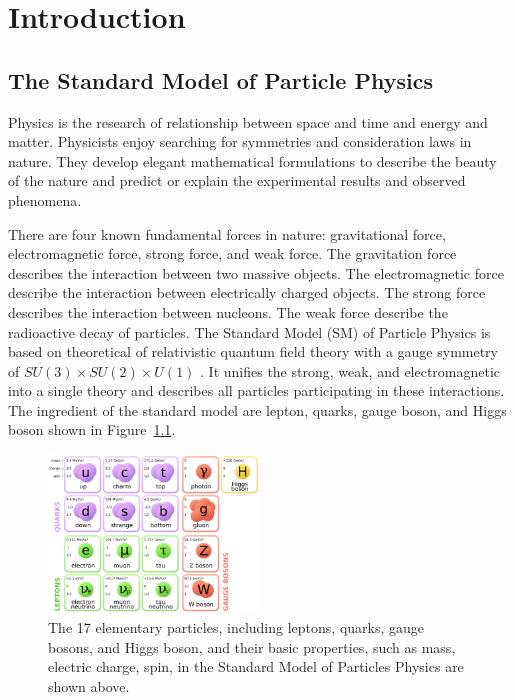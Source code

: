 
\chapter{Introduction}

\section{The Standard Model of Particle Physics}

Physics is the research of relationship between space and time and energy and matter. Physicists enjoy searching for symmetries and consideration laws in nature. They develop elegant mathematical formulations to describe the beauty of the nature and predict or explain the experimental results and observed phenomena. 

There are four known fundamental forces in nature: gravitational force, electromagnetic force, strong force, and weak force. The gravitation force describes the interaction between two massive objects. The electromagnetic force describe the interaction between electrically charged objects. The strong force describes the interaction between nucleons. The weak force describe the radioactive decay of particles. The Standard Model (SM) of Particle Physics is based on theoretical of relativistic quantum field theory with a gauge symmetry of $SU(3) \times SU(2) \times U(1)$ \cite{SMTheory}. It unifies the strong, weak, and electromagnetic into a single theory and describes all particles participating in these interactions. The ingredient of the standard model are lepton, quarks, gauge boson, and Higgs boson shown in Figure~\ref{fig:SMParticle}.

\begin{figure}[hbtp]
\begin{center}
\includegraphics[width=0.50\textwidth]{Figures/Chapter1/SMParticles.png}
\caption{The 17 elementary particles, including leptons, quarks, gauge bosons, and Higgs boson, and their basic properties, such as mass, electric charge, spin, in the Standard Model of Particles Physics are shown above.}
\label{fig:SMParticle}
\end{center}
\end{figure} 


